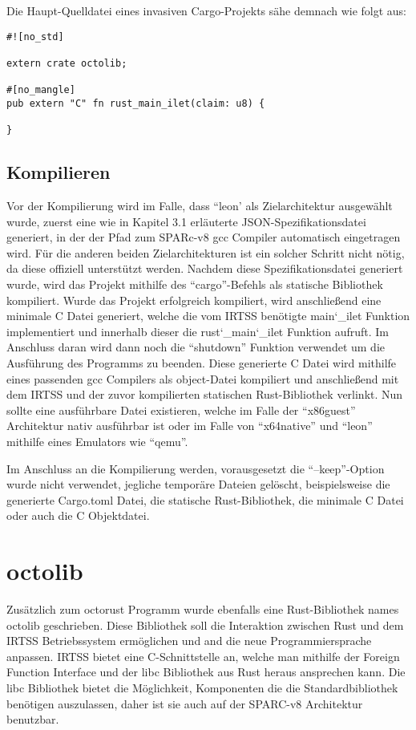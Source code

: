 Die Haupt-Quelldatei eines invasiven Cargo-Projekts sähe demnach wie folgt aus:
\begin{verbatim}
#![no_std]

extern crate octolib;

#[no_mangle]
pub extern "C" fn rust_main_ilet(claim: u8) {

}
\end{verbatim}

\subsection{Kompilieren}

Vor der Kompilierung wird im Falle, dass ``leon' als Zielarchitektur ausgewählt wurde, zuerst eine wie in Kapitel 3.1 erläuterte
JSON-Spezifikationsdatei generiert, in der der Pfad zum SPARc-v8 gcc Compiler automatisch eingetragen wird. Für die anderen beiden
Zielarchitekturen ist ein solcher Schritt nicht nötig, da diese offiziell unterstützt werden. 
Nachdem diese Spezifikationsdatei generiert wurde, wird das Projekt mithilfe des ``cargo''-Befehls als statische Bibliothek 
kompiliert. Wurde das Projekt erfolgreich kompiliert, wird anschließend eine minimale C Datei generiert,
welche die vom IRTSS benötigte main\char`_ilet Funktion implementiert und innerhalb
dieser die rust\char`_main\char`_ilet Funktion aufruft. Im Anschluss daran wird dann noch die ``shutdown'' Funktion verwendet um die 
Ausführung des Programms zu beenden. Diese generierte C Datei wird mithilfe eines passenden gcc Compilers als object-Datei kompiliert
und anschließend mit dem IRTSS und der zuvor kompilierten statischen Rust-Bibliothek verlinkt. Nun sollte eine ausführbare Datei
existieren, welche im Falle der ``x86guest'' Architektur nativ ausführbar ist oder im Falle von ``x64native'' und ``leon''
mithilfe eines Emulators wie ``qemu''.

Im Anschluss an die Kompilierung werden, vorausgesetzt die ``--keep''-Option wurde nicht verwendet, jegliche temporäre Dateien
gelöscht, beispielsweise die generierte Cargo.toml Datei, die statische Rust-Bibliothek, die minimale C Datei oder auch die C
Objektdatei.

\section{octolib}

Zusätzlich zum octorust Programm wurde ebenfalls eine Rust-Bibliothek names octolib geschrieben. Diese Bibliothek soll
die Interaktion zwischen Rust und dem IRTSS Betriebssystem ermöglichen und and die neue Programmiersprache anpassen. IRTSS
bietet eine C-Schnittstelle an, welche man mithilfe der Foreign Function Interface und der libc Bibliothek aus Rust heraus ansprechen
kann. Die libc Bibliothek bietet die Möglichkeit, Komponenten die die Standardbibliothek benötigen auszulassen, daher ist sie
auch auf der SPARC-v8 Architektur benutzbar.

